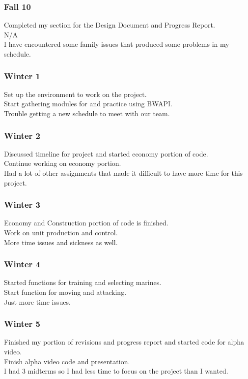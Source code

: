 \subsubsection{Fall 10}
Completed my section for the Design Document and Progress Report.\\ N/A\\ I have encountered some family issues that produced some problems in my schedule.\\

\subsubsection{Winter 1}
Set up the environment to work on the project.\\ Start gathering modules for and practice using BWAPI.\\ Trouble getting a new schedule to meet with our team.\\

\subsubsection{Winter 2}
Discussed timeline for project and started economy portion of code.\\ Continue working on economy portion.\\ Had a lot of other assignments that made it difficult to have more time for this project.\\

\subsubsection{Winter 3}
Economy and Construction portion of code is finished.\\ Work on unit production and control.\\ More time issues and sickness as well.\\

\subsubsection{Winter 4}
Started functions for training and selecting marines.\\ Start function for moving and attacking.\\ Just more time issues.\\

\subsubsection{Winter 5}
Finished my portion of revisions and progress report and started code for alpha video.\\ Finish alpha video code and presentation.\\ I had 3 midterms so I had less time to focus on the project than I wanted.\\

